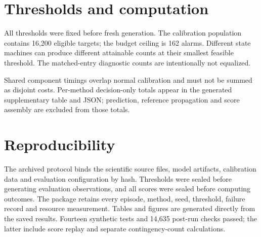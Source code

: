 \section{Thresholds and computation}
All thresholds were fixed before fresh generation. The calibration population contains 16,200 eligible targets; the budget ceiling is 162 alarms. Different state machines can produce different attainable counts at their smallest feasible threshold. The matched-entry diagnostic counts are intentionally not equalized.
\begin{center}\small\end{center}
\begin{center}\small\end{center}
Shared component timings overlap normal calibration and must not be summed as disjoint costs. Per-method decision-only totals appear in the generated supplementary table and JSON; prediction, reference propagation and score assembly are excluded from those totals.
\section{Reproducibility}
The archived protocol binds the scientific source files, model artifacts, calibration data and evaluation configuration by hash. Thresholds were sealed before generating evaluation observations, and all scores were sealed before computing outcomes. The package retains every episode, method, seed, threshold, failure record and resource measurement. Tables and figures are generated directly from the saved results. Fourteen synthetic tests and 14,635 post-run checks passed; the latter include score replay and separate contingency-count calculations.
